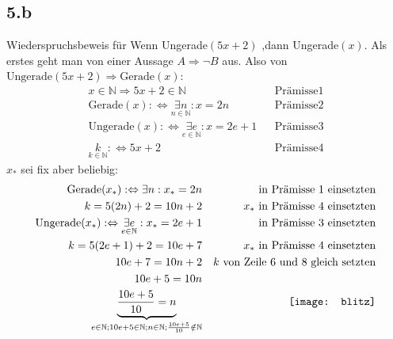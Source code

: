\documentclass[10pt,ngerman]{scrartcl}
\begin{document}
\subsection{5.b}
Wiederspruchsbeweis für \glqq Wenn Ungerade$(5x+2)$ ,dann Ungerade$(x)$\grqq{}. Als erstes geht man von einer Aussage $A \Rightarrow \neg B$ aus. Also von $\text{Ungerade}(5x + 2) \Rightarrow \text{Gerade}(x)$:
\setcounter{equation}{0}
\begin{align}
x  \in \mathbb{N} \Rightarrow 5x +2 \in \mathbb{N} && \text{Prämisse} 1 \\
\text{Gerade}(x) : \Leftrightarrow \underset{n \in \mathbb{N}}{\exists n}: x = 2n && \text{Prämisse}2\\
\text{Ungerade}(x) : \Leftrightarrow \underset{e \in \mathbb{N}}{\exists e}: x = 2e +1 && \text{Prämisse}3\\
\underset{k \in \mathbb{N}}{k} : \Leftrightarrow 5x + 2 && \text{Prämisse}4
\end{align}
$x_*$ sei fix aber beliebig:\\
\begin{align}
\text{Gerade}(x_*):\Leftrightarrow \exists n : x_* = 2n && \text{ in Prämisse } 1 \text{ einsetzten}\\
k = 5(2n) +2 = 10 n +2 && x_*\text{ in Prämisse } 4 \text{ einsetzten}\\
\text{Ungerade}(x_*) : \Leftrightarrow \underset{e \in \mathbb{N}}{\exists e}: x_* = 2e +1 && \text{ in Prämisse } 3 \text{ einsetzten}\\
k = 5(2e +1) +2 = 10e +7 && x_*\text{ in Prämisse } 4 \text{ einsetzten}\\
10 e + 7 = 10 n + 2  && k \text{ von Zeile } 6 \text{ und } 8 \text{ gleich setzten}\\
10e+5 = 10n\\
\underbrace{\frac{10 e + 5}{10} = n}_{ e \in \mathbb{N} ; 10e +5 \in \mathbb{N}; n \in \mathbb{N}; \frac{10e +5}{10} \notin \mathbb{N}} && \qquad \vcenter{\hbox{\texttt{[image: blitz]}}}
\end{align}
\end{document}
